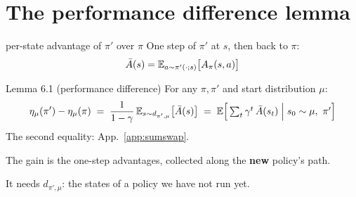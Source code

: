 \section{The performance difference lemma}
\label{sec:pdl}

\begin{defbox}{per-state advantage of $\pi'$ over $\pi$}
One step of $\pi'$ at $s$, then back to $\pi$:
\begin{gather*}
  \bar A(s) = \mathbb{E}_{a\sim\pi'(\cdot;s)}\big[A_\pi(s,a)\big]
\end{gather*}
\end{defbox}

\begin{thmbox}{Lemma 6.1 (performance difference)}
For any $\pi,\pi'$ and start distribution $\mu$:
\begin{gather*}
  \eta_\mu(\pi') - \eta_\mu(\pi) \;=\; \frac{1}{1-\gamma}\,\mathbb{E}_{s\sim d_{\pi',\mu}}\big[\bar A(s)\big]
  \;=\; \mathbb{E}\Big[\textstyle\sum_t \gamma^t\,\bar A(s_t) \;\Big|\; s_0\sim\mu,\ \pi'\Big]
\end{gather*}
{\footnotesize The second equality: App.~\ref{app:sumswap}.}
\end{thmbox}

\begin{center}
\end{center}

\begin{pair}
\begin{keybox}[title={Exact}]
The gain is the one-step advantages, collected along the \textbf{new} policy's path.
\end{keybox}
\begin{warnbox}[title={Not measurable}]
It needs $d_{\pi',\mu}$: the states of a policy we have not run yet.
\end{warnbox}
\end{pair}


